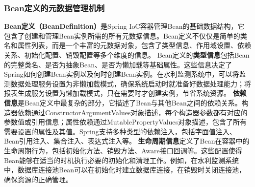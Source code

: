 \subsubsection{Bean定义的元数据管理机制}\label{beanux5b9aux4e49ux7684ux5143ux6570ux636eux7ba1ux7406ux673aux5236}
\textbf{Bean定义（BeanDefinition）}是Spring
IoC容器管理Bean的基础数据结构，它包含了创建和管理Bean实例所需的所有元数据信息。Bean定义不仅仅是简单的类名和属性列表，而是一个丰富的元数据对象，包含了类型信息、作用域设置、依赖关系、初始化配置、销毁配置等多个维度的信息。
Bean定义的\textbf{类型信息}包括Bean的完整类名、是否为抽象Bean、是否为懒加载等基础属性。这些信息决定了Spring如何创建Bean实例以及何时创建Bean实例。在水利监测系统中，可以将监测数据处理服务设置为非懒加载模式，确保系统启动时就准备好数据处理能力；将报表生成服务设置为懒加载模式，只在需要时才创建实例，节省系统资源。
\textbf{依赖信息}是Bean定义中最复杂的部分，它描述了Bean与其他Bean之间的依赖关系。构造器依赖通过ConstructorArgumentValues对象描述，每个构造器参数都有对应的参数值或引用信息；属性依赖通过MutablePropertyValues对象描述，包含了所有需要设置的属性及其值。Spring支持多种类型的依赖注入，包括字面值注入、Bean引用注入、集合注入、表达式注入等。
\textbf{生命周期信息}定义了Bean在容器中的生命周期行为，包括初始化方法、销毁方法、Aware接口回调等。这些配置使得Bean能够在适当的时机执行必要的初始化和清理工作。例如，在水利监测系统中，数据库连接池Bean可以在初始化时建立数据库连接，在销毁时关闭连接池，确保资源的正确管理。
